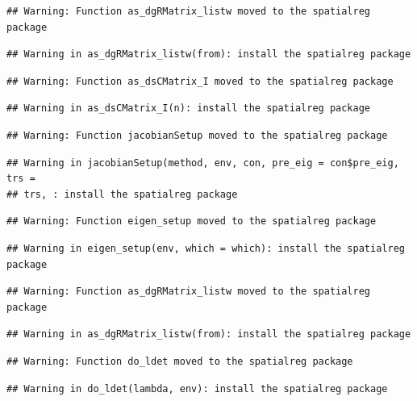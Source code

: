 \documentclass[11pt,]{article}
\begin{document}
\begin{verbatim}
## Warning: Function as_dgRMatrix_listw moved to the spatialreg package
\end{verbatim}

\begin{verbatim}
## Warning in as_dgRMatrix_listw(from): install the spatialreg package
\end{verbatim}

\begin{verbatim}
## Warning: Function as_dsCMatrix_I moved to the spatialreg package
\end{verbatim}

\begin{verbatim}
## Warning in as_dsCMatrix_I(n): install the spatialreg package
\end{verbatim}

\begin{verbatim}
## Warning: Function jacobianSetup moved to the spatialreg package
\end{verbatim}

\begin{verbatim}
## Warning in jacobianSetup(method, env, con, pre_eig = con$pre_eig, trs =
## trs, : install the spatialreg package
\end{verbatim}

\begin{verbatim}
## Warning: Function eigen_setup moved to the spatialreg package
\end{verbatim}

\begin{verbatim}
## Warning in eigen_setup(env, which = which): install the spatialreg package
\end{verbatim}

\begin{verbatim}
## Warning: Function as_dgRMatrix_listw moved to the spatialreg package
\end{verbatim}

\begin{verbatim}
## Warning in as_dgRMatrix_listw(from): install the spatialreg package
\end{verbatim}

\begin{verbatim}
## Warning: Function do_ldet moved to the spatialreg package
\end{verbatim}

\begin{verbatim}
## Warning in do_ldet(lambda, env): install the spatialreg package
\end{verbatim}
\end{document}
